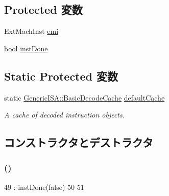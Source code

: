 \subsection*{Protected 変数}
\begin{DoxyCompactItemize}
\item 
ExtMachInst \hyperlink{classPowerISA_1_1Decoder_abf211faf305b89c9093b00b6b82b0bd1}{emi}
\item 
bool \hyperlink{classPowerISA_1_1Decoder_a37c5d55785204b8fd00a8ebf62e1fc33}{instDone}
\end{DoxyCompactItemize}
\subsection*{Static Protected 変数}
\begin{DoxyCompactItemize}
\item 
static \hyperlink{classGenericISA_1_1BasicDecodeCache}{GenericISA::BasicDecodeCache} \hyperlink{classPowerISA_1_1Decoder_a8800313f93afe356e1177866068cc8d6}{defaultCache}
\begin{DoxyCompactList}\small\item\em A cache of decoded instruction objects. \item\end{DoxyCompactList}\end{DoxyCompactItemize}


\subsection{コンストラクタとデストラクタ}
\hypertarget{classPowerISA_1_1Decoder_aedfa2b7d97ed17b14903ed75d6214c78}{
\subsubsection[{Decoder}]{ ()}}
\label{classPowerISA_1_1Decoder_aedfa2b7d97ed17b14903ed75d6214c78}



\begin{DoxyCode}
49               : instDone(false)
50     {
51     }
\end{DoxyCode}


